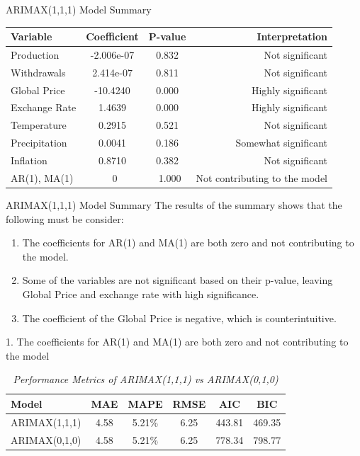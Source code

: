 \documentclass[12pt, aspectratio=169]{beamer}
\begin{document}
\begin{frame}{ARIMAX(1,1,1) Model Summary}
    \begin{center}
            \begin{tabular}{lccr}
        \toprule
        Variable & Coefficient & P-value & Interpretation \\
        \midrule
        Production  & -2.006e-07 &  0.832  &  Not significant \\
        Withdrawals & 2.414e-07 &  0.811  &  Not significant  \\
       Global Price  & -10.4240   &  0.000  &  Highly significant \\ 
        Exchange Rate&  1.4639    &  0.000  &  Highly significant\\ 
        Temperature   &  0.2915    &  0.521  &  Not significant\\ 
        Precipitation &  0.0041    &  0.186  &  Somewhat significant \\
         Inflation &  0.8710    &  0.382  &  Not significant \\ 
        AR(1), MA(1)   &   ~0       & ~1.000  &  Not contributing to the model \\
        \bottomrule
    \end{tabular}
    \end{center}
\end{frame}

\begin{frame}{ARIMAX(1,1,1) Model Summary}
    The results of the summary shows that the following must be consider:
    \begin{enumerate}
        \item The coefficients for AR(1) and MA(1) are both zero and not contributing to the model. 
        \item Some of the variables are not significant based on their p-value, leaving Global Price and exchange rate with high significance.
        \item The coefficient of the Global Price is negative, which is counterintuitive.
    \end{enumerate}
\end{frame}

\begin{frame}{1. The coefficients for AR(1) and MA(1) are both zero and not contributing to the model}
      \begin{table}[H]
        \caption{\textit{Performance Metrics of ARIMAX(1,1,1) vs ARIMAX(0,1,0)}}
        \label{arimax010}
        \centering
        \begin{tabular}{lccccc}
            \toprule
            Model & MAE & MAPE & RMSE & AIC & BIC \\
            \midrule
            ARIMAX(1,1,1) & 4.58 & 5.21\% & 6.25 & 443.81 & 469.35 \\
            ARIMAX(0,1,0) & 4.58 & 5.21\% & 6.25 & 778.34 & 798.77 \\
            \bottomrule
        \end{tabular}
    \end{table}
\end{frame}
\end{document}

